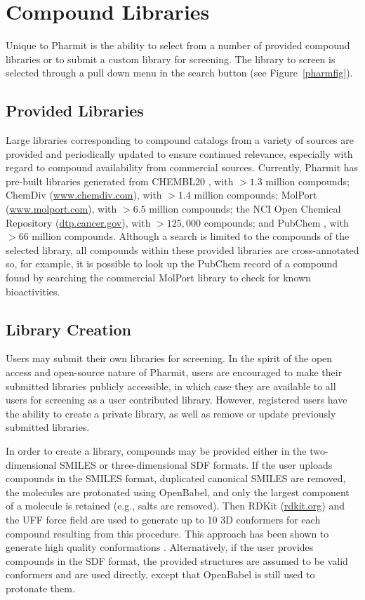\section{Compound Libraries}

Unique to Pharmit is the ability to select from a number of provided compound libraries or to submit a custom library for screening.  The library to screen is selected through a pull down menu in the search button (see Figure~\ref{pharmfig}).  

\subsection{Provided Libraries}

Large libraries corresponding to compound catalogs from a variety of sources are provided and periodically updated to ensure continued relevance, especially with regard to compound availability from commercial sources.  Currently, Pharmit has pre-built libraries generated from CHEMBL20 \cite{Gaulton_2011}, with $>1.3$ million compounds; ChemDiv (\url{www.chemdiv.com}), with $>1.4$ million compounds; MolPort (\url{www.molport.com}), with $>6.5$ million compounds; the NCI Open Chemical Repository (\url{dtp.cancer.gov}), with $>125,000$ compounds; and PubChem \cite{Kim_2015}, with $>66$ million compounds. 
 Although a search is limited to the compounds of the selected library, all compounds within these provided libraries are cross-annotated so, for example, it is possible to look up the PubChem record of a compound found by searching the commercial MolPort library to check for known bioactivities.


\subsection{Library Creation}

Users may submit their own libraries for screening.  In the spirit of the open access and open-source nature of Pharmit, users are encouraged to make their submitted libraries publicly accessible, in which case they are available to all users for screening as a user contributed library.  However, registered users have the ability to create a private library, as well as remove or update previously submitted libraries. 

In order to create a library, compounds may be provided either in the two-dimensional SMILES or three-dimensional SDF formats.  If the user uploads compounds in the SMILES format, duplicated canonical SMILES are removed, the molecules are protonated using OpenBabel, and only the largest component of a molecule is retained (e.g., salts are removed).  Then RDKit (\url{rdkit.org}) and the UFF force field \cite{Rappe_1992} are used to generate up to 10 3D conformers for each compound resulting from this procedure.  This approach has been shown to generate high quality conformations \cite{Ebejer_2012}.  Alternatively, if the user provides compounds in the SDF format, the provided structures are assumed to be valid conformers and are used directly, except that OpenBabel is still used to protonate them.
